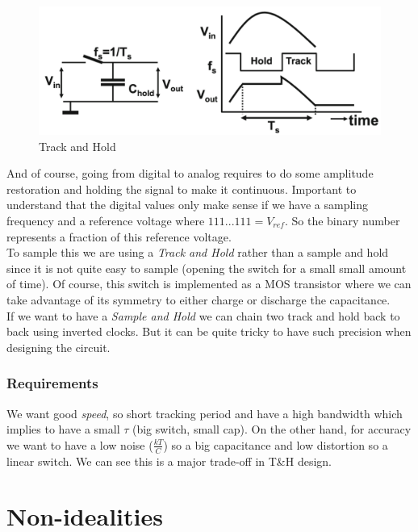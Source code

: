 \documentclass{report}
\begin{document}
\begin{figure}
  \begin{center}
    \includegraphics[width=0.95\linewidth]{img/th.png}
  \end{center}
  \caption{Track and Hold}
\end{figure}


And of course, going from digital to analog requires to do some amplitude restoration and holding the signal to make it continuous. Important to understand that the digital values only make sense if we have a sampling frequency and a reference voltage where $111...111 = V_{ref}$. So the binary number represents a fraction of this reference voltage.\\
To sample this we are using a \textit{Track and Hold} rather than a sample and hold since it is not quite easy to sample (opening the switch for a small small amount of time). Of course, this switch is implemented as a MOS transistor where we can take advantage of its symmetry to either charge or discharge the capacitance.\\
If we want to have a \textit{Sample and Hold} we can chain two track and hold back to back using inverted clocks. But it can be quite tricky to have such precision when designing the circuit.

\subsubsection{Requirements}

We want good \textit{speed}, so short tracking period and have a high bandwidth which implies to have a small $\tau$ (big switch, small cap). On the other hand, for accuracy we want to have a low noise ($\frac{kT}{C}$) so a big capacitance and low distortion so a linear switch. We can see this is a major trade-off in T\&H design.

\section{Non-idealities}
\end{document}
